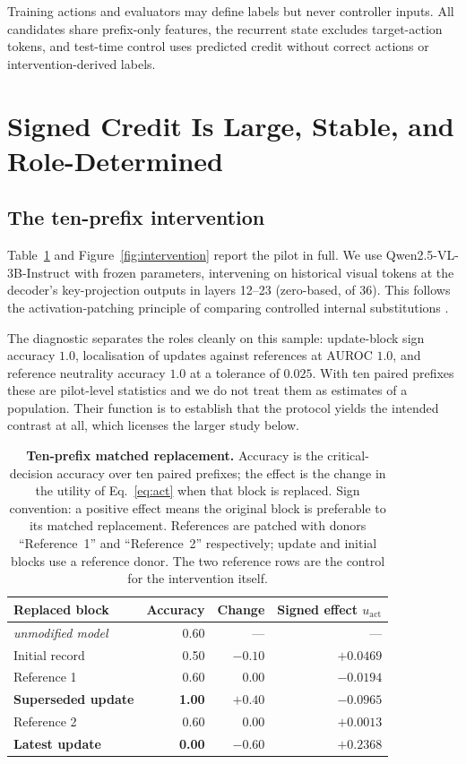 \documentclass{article}
\begin{document}
Training actions and evaluators may define labels but never controller inputs.
All candidates share prefix-only features, the recurrent state excludes
target-action tokens, and test-time control uses predicted credit without
correct actions or intervention-derived labels.

\section{Signed Credit Is Large, Stable, and Role-Determined}
\label{sec:credit}

\subsection{The ten-prefix intervention}
\label{sec:interference}

Table~\ref{tab:pilot} and Figure~\ref{fig:intervention} report the pilot in
full. We use Qwen2.5-VL-3B-Instruct \citep{bai2025qwen} with frozen parameters,
intervening on historical visual tokens at the decoder's key-projection outputs
in layers 12--23 (zero-based, of 36). This follows the activation-patching
principle of comparing controlled internal substitutions
\citep{zhang2024patching}.

The diagnostic separates the roles cleanly on this sample: update-block sign
accuracy $1.0$, localisation of updates against references at AUROC $1.0$, and
reference neutrality accuracy $1.0$ at a tolerance of $0.025$. With ten paired
prefixes these are pilot-level statistics and we do not treat them as estimates
of a population. Their function is to establish that the protocol yields the
intended contrast at all, which licenses the larger study below.

\begin{table}[tbp]
\caption{\textbf{Ten-prefix matched replacement.} Accuracy is the
critical-decision accuracy over ten paired prefixes; the effect is the change in
the utility of Eq.~\eqref{eq:act} when that block is replaced. Sign convention:
a positive effect means the original block is preferable to its matched
replacement. References are patched with donors ``Reference~1'' and
``Reference~2'' respectively; update and initial blocks use a reference donor.
The two reference rows are the control for the intervention itself.}
\label{tab:pilot}
\centering
\small
\begin{tabular}{lrrr}
\toprule
Replaced block & Accuracy & Change & Signed effect $u_{\mathrm{act}}$\\
\midrule
\emph{unmodified model} & 0.60 & --- & ---\\
Initial record            & 0.50 & $-0.10$ & $+0.0469$\\
Reference 1               & 0.60 & $\phantom{-}0.00$ & $-0.0194$\\
\textbf{Superseded update}& \textbf{1.00} & $+0.40$ & $\mathbf{-0.0965}$\\
Reference 2               & 0.60 & $\phantom{-}0.00$ & $+0.0013$\\
\textbf{Latest update}    & \textbf{0.00} & $-0.60$ & $\mathbf{+0.2368}$\\
\bottomrule
\end{tabular}
\end{table}
\end{document}
